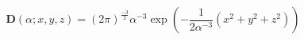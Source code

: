 \documentclass{jsarticle}
\begin{document}
\[
  \mathbf{D}(\alpha ; x, y, z) = (2\pi)^{\frac{-3}{2}} \alpha^{-3} \exp(- \frac{1}{2\alpha^{-3}}(x^2 + y^2 + z^2))
\]
\end{document}
